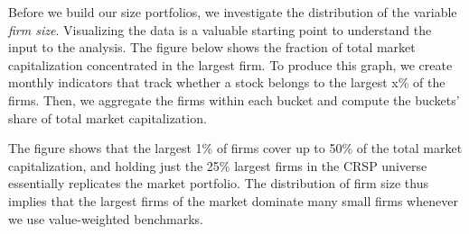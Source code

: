 \documentclass[
]{krantz}
\begin{document}
Before we build our size portfolios, we investigate the distribution of the variable \emph{firm size}. Visualizing the data is a valuable starting point to understand the input to the analysis. The figure below shows the fraction of total market capitalization concentrated in the largest firm. To produce this graph, we create monthly indicators that track whether a stock belongs to the largest x\% of the firms.
Then, we aggregate the firms within each bucket and compute the buckets' share of total market capitalization.

The figure shows that the largest 1\% of firms cover up to 50\% of the total market capitalization, and holding just the 25\% largest firms in the CRSP universe essentially replicates the market portfolio. The distribution of firm size thus implies that the largest firms of the market dominate many small firms whenever we use value-weighted benchmarks.
\end{document}
